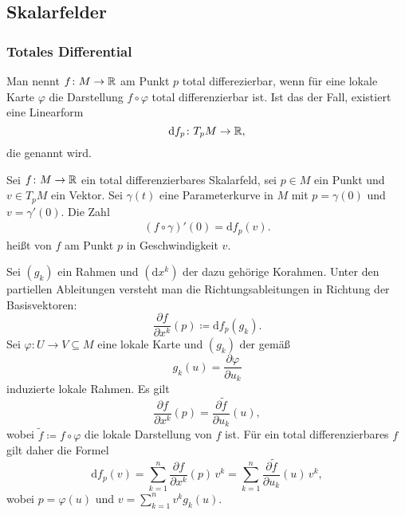\subsection{Skalarfelder}
\subsubsection{Totales Differential}
\begin{definition}\mbox{}\newline
Man nennt $f\colon M\to\mathbb R$ am Punkt $p$ total differezierbar, wenn für
eine lokale Karte $\varphi$ die Darstellung $f\circ\varphi$ total
differenzierbar ist. Ist das der Fall, existiert eine Linearform%
\[\mathrm df_p\colon T_p M\to\mathbb R,\]
die  genannt wird.
\end{definition}

\begin{definition}[Richtungsableitung]\mbox{}\newline
Sei $f\colon M\to\mathbb R$ ein total differenzierbares Skalarfeld, sei
$p\in M$ ein Punkt und $v\in T_p M$ ein Vektor. Sei $\gamma(t)$ eine
Parameterkurve in $M$ mit $p=\gamma(0)$ und $v=\gamma'(0)$.
Die Zahl%
\begin{gather}
(f\circ\gamma)'(0) = \mathrm df_p(v).
\end{gather}
heißt  von $f$ am Punkt $p$ in
Geschwindigkeit $v$.
\end{definition}

\noindent
Sei $(g_k)$ ein Rahmen und $(\mathrm dx^k)$ der dazu gehörige
Korahmen. Unter den partiellen Ableitungen versteht man die
Richtungsableitungen in Richtung der Basisvektoren:%
\begin{equation}
\frac{\partial f}{\partial x^k}(p)\coloneq \mathrm df_p(g_k).
\end{equation}
Sei $\varphi\colon U\to V\subseteq M$ eine lokale Karte und
$(g_k)$ der gemäß%
\begin{equation}
g_k(u) = \frac{\partial\varphi}{\partial u_k}
\end{equation}
induzierte lokale Rahmen. Es gilt
\begin{equation}
\frac{\partial f}{\partial x^k}(p) = \frac{\partial\tilde f}{\partial u_k}(u),
\end{equation}
wobei $\tilde f\coloneq f\circ\varphi$ die
lokale Darstellung von $f$ ist. Für ein total differenzierbares $f$
gilt daher die Formel%
\begin{equation}
\mathrm df_p(v) = \sum_{k=1}^n \frac{\partial f}{\partial x^k}(p)\,v^k
= \sum_{k=1}^n \frac{\partial\tilde f}{\partial u_k}(u)\,v^k,
\end{equation}
wobei $p=\varphi(u)$ und $v=\sum_{k=1}^n v^k g_k(u)$.

